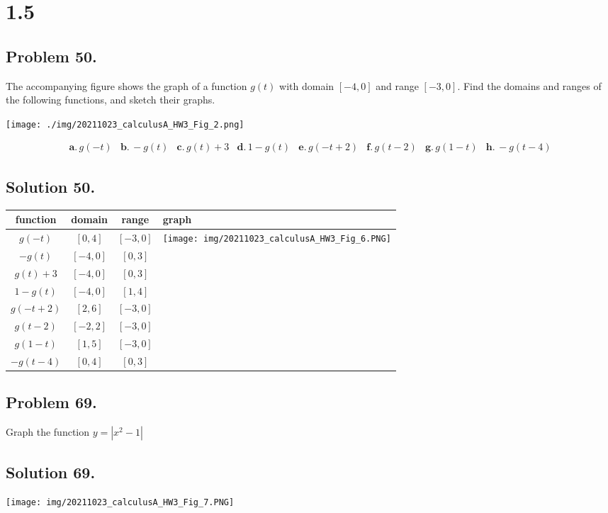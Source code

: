 \documentclass{article}
\begin{document}
\section*{1.5}
\subsection* {Problem 50.}
The accompanying figure shows the graph of a function $g(t)$ with domain $[-4,0]$ and range $[-3,0]$. Find the domains and ranges of the following functions, and sketch their graphs.
\begin{center}
\texttt{[image: ./img/20211023\_calculusA\_HW3\_Fig\_2.png]}
\end{center}
\[\begin{array}{cccccccc}\mathbf{a.}\,g(-t)&\mathbf{b.}\,-g(t)&\mathbf{c.}\,g(t)+3&\mathbf{d.}\,1-g(t)&\mathbf{e.}\,g(-t+2)&\mathbf{f.}\,g(t-2)&\mathbf{g.}\,g(1-t)&\mathbf{h.}\,-g(t-4)\end{array}\]
\subsection*{Solution 50.}


\begin{tabular}[b]{|c|c|c|p{100mm}|}
\hline
function&domain&range&graph\\
\hline
$g(-t)$&$[0,4]$&$[-3,0]$&\multirow{8}{*}{\texttt{[image: img/20211023\_calculusA\_HW3\_Fig\_6.PNG]}}\\[1.3ex]
\cline{1-3}
$-g(t)$&$[-4,0]$&$[0,3]$\\[1.3ex]
\cline{1-3}
$g(t)+3$&$[-4,0]$&$[0,3]$\\[1.3ex]
\cline{1-3}
$1-g(t)$&$[-4,0]$&$[1,4]$\\[1.3ex]
\cline{1-3}
$g(-t+2)$&$[2,6]$&$[-3,0]$\\[1.3ex]
\cline{1-3}
$g(t-2)$&$[-2,2]$&$[-3,0]$\\[1.3ex]
\cline{1-3}
$g(1-t)$&$[1,5]$&$[-3,0]$\\[1.3ex]
\cline{1-3}
$-g(t-4)$&$[0,4]$&$[0,3]$\\[1.3ex]
\hline
\end{tabular}
\subsection* {Problem 69.}
Graph the function $y=|x^2-1|$
\subsection*{Solution 69.}
\texttt{[image: img/20211023\_calculusA\_HW3\_Fig\_7.PNG]}
\end{document}
